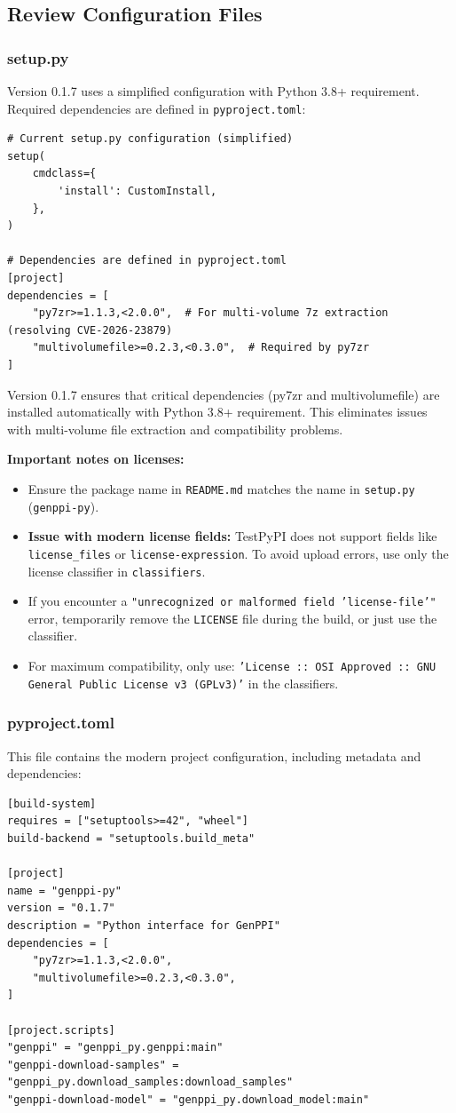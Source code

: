 \documentclass[11pt, a4paper]{article}
\begin{document}
\subsection{Review Configuration Files}
\subsubsection{setup.py}
Version 0.1.7 uses a simplified configuration with Python 3.8+ requirement. Required dependencies are defined in \texttt{pyproject.toml}:
\begin{lstlisting}[style=pythonstyle]
# Current setup.py configuration (simplified)
setup(
    cmdclass={
        'install': CustomInstall,
    },
)

# Dependencies are defined in pyproject.toml
[project]
dependencies = [
    "py7zr>=1.1.3,<2.0.0",  # For multi-volume 7z extraction (resolving CVE-2026-23879)
    "multivolumefile>=0.2.3,<0.3.0",  # Required by py7zr
]
\end{lstlisting}
Version 0.1.7 ensures that critical dependencies (py7zr and multivolumefile) are installed automatically with Python 3.8+ requirement. This eliminates issues with multi-volume file extraction and compatibility problems.

\textbf{Important notes on licenses:} 
\begin{itemize}
    \item Ensure the package name in \texttt{README.md} matches the name in \texttt{setup.py} (\texttt{genppi-py}).
    \item \textbf{Issue with modern license fields:} TestPyPI does not support fields like \texttt{license\_files} or \texttt{license-expression}. To avoid upload errors, use only the license classifier in \texttt{classifiers}.
    \item If you encounter a \texttt{"unrecognized or malformed field 'license-file'"} error, temporarily remove the \texttt{LICENSE} file during the build, or just use the classifier.
    \item For maximum compatibility, only use: \texttt{'License :: OSI Approved :: GNU General Public License v3 (GPLv3)'} in the classifiers.
\end{itemize}

\subsubsection{pyproject.toml}
This file contains the modern project configuration, including metadata and dependencies:
\begin{lstlisting}[style=bashstyle]
[build-system]
requires = ["setuptools>=42", "wheel"]
build-backend = "setuptools.build_meta"

[project]
name = "genppi-py"
version = "0.1.7"
description = "Python interface for GenPPI"
dependencies = [
    "py7zr>=1.1.3,<2.0.0",
    "multivolumefile>=0.2.3,<0.3.0",
]

[project.scripts]
"genppi" = "genppi_py.genppi:main"
"genppi-download-samples" = "genppi_py.download_samples:download_samples"
"genppi-download-model" = "genppi_py.download_model:main"
\end{lstlisting}
\end{document}
